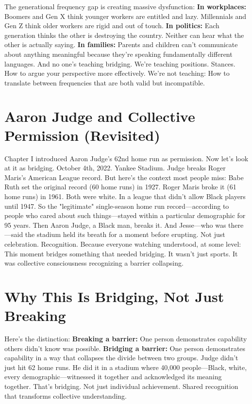 \documentclass[12pt,openany]{book}
\begin{document}
The generational frequency gap is creating massive dysfunction:
\textbf{In workplaces:} Boomers and Gen X think younger workers are entitled and lazy. Millennials and Gen Z think older workers are rigid and out of touch.
\textbf{In politics:} Each generation thinks the other is destroying the country. Neither can hear what the other is actually saying.
\textbf{In families:} Parents and children can't communicate about anything meaningful because they're speaking fundamentally different languages.
And no one's teaching bridging.
We're teaching positions. Stances. How to argue your perspective more effectively.
We're not teaching: How to translate between frequencies that are both valid but incompatible.

\section{Aaron Judge and Collective Permission (Revisited)}

Chapter I introduced Aaron Judge's 62nd home run as permission. Now let's look at it as bridging.
October 4th, 2022. Yankee Stadium. Judge breaks Roger Maris's American League record.
But here's the context most people miss:
Babe Ruth set the original record (60 home runs) in 1927. Roger Maris broke it (61 home runs) in 1961.
Both were white. In a league that didn't allow Black players until 1947.
So the "legitimate" single-season home run record—according to people who cared about such things—stayed within a particular demographic for 95 years.
Then Aaron Judge, a Black man, breaks it.
And Jesse—who was there—said the stadium held its breath for a moment before erupting.
Not just celebration. Recognition.
Because everyone watching understood, at some level: This moment bridges something that needed bridging.
It wasn't just sports. It was collective consciousness recognizing a barrier collapsing.

\section{Why This Is Bridging, Not Just Breaking}

Here's the distinction:
\textbf{Breaking a barrier:} One person demonstrates capability others didn't know was possible.
\textbf{Bridging a barrier:} One person demonstrates capability in a way that collapses the divide between two groups.
Judge didn't just hit 62 home runs. He did it in a stadium where 40,000 people—Black, white, every demographic—witnessed it together and acknowledged its meaning together.
That's bridging. Not just individual achievement. Shared recognition that transforms collective understanding.
\end{document}
